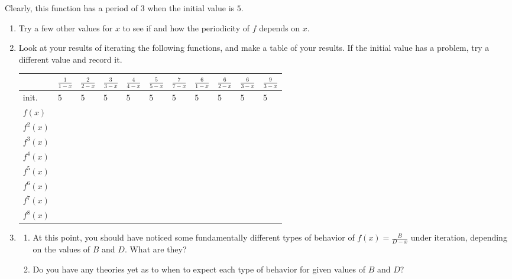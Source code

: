 \documentclass[../gatm.tex]{subfiles}
\begin{document}
Clearly, this function has a period of $3$ when the initial value is $5$.
\begin{enumerate}
\item Try a few other values for $x$ to see if and how the periodicity of $f$ depends on $x$.
\item Look at your results of iterating the following functions, and make a table of your results. If the initial value has a problem, try a different value and record it.
\begin{center}
\renewcommand*{\arraystretch}{1.4}
\begin{tabular}{|l|l|l|l|l|l|l|l|l|l|l|}
\hline
         & $\frac{1}{1-x}$ & $\frac{2}{2-x}$ & $\frac{3}{3-x}$ & $\frac{4}{4-x}$ & $\frac{5}{5-x}$ & $\frac{7}{7-x}$ & $\frac{6}{1-x}$ & $\frac{6}{2-x}$ & $\frac{6}{3-x}$ & $\frac{9}{3-x}$ \\ \hline
init.    & $5$   & $5$   & $5$ & $5$ & $5$ & $5$ & $5$ & $5$ & $5$ & $5$ \\ \hline
$f(x)$   &       &       &   &   &   &   &   &   &   &   \\ \hline
$f^2(x)$ &       &       &   &   &   &   &   &   &   &   \\ \hline
$f^3(x)$ &       &       &   &   &   &   &   &   &   &   \\ \hline
$f^4(x)$ &       &       &   &   &   &   &   &   &   &   \\ \hline
$f^5(x)$ &       &       &   &   &   &   &   &   &   &   \\ \hline
$f^6(x)$ &       &       &   &   &   &   &   &   &   &   \\ \hline
$f^7(x)$ &       &       &   &   &   &   &   &   &   &   \\ \hline
$f^8(x)$ &       &       &   &   &   &   &   &   &   &   \\ \hline
\end{tabular}
\end{center}
\item \begin{enumerate}
\item At this point, you should have noticed some fundamentally different types of behavior of $f(x)=\frac{B}{D-x}$ under iteration, depending on the values of $B$ and $D$. What are they?
\item Do you have any theories yet as to when to expect each type of behavior for given values of $B$ and $D$? 
\end{enumerate}
\end{enumerate}
\end{document}
